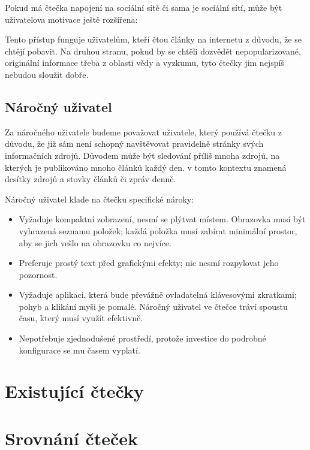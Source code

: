 Pokud má čtečka napojení na sociální sítě či sama je sociální sítí, může být uživatelova motivace ještě rozšířena:

Tento přístup funguje uživatelům, kteří čtou články na internetu z důvodu, že se chtějí pobavit.
Na druhou stranu, pokud by se chtěli dozvědět nepopularizované, originální informace třeba z oblasti vědy a vyzkumu, tyto čtečky jim nejspíš nebudou sloužit dobře.

\subsection{Náročný uživatel}

Za náročného uživatele budeme považovat uživatele, který používá čtečku z důvodu, že již sám není schopný navštěvovat pravidelně stránky svých informačních zdrojů.
Důvodem může být sledování příliš mnoha zdrojů, na kterých je publikováno mnoho článků každý den.
 v tomto kontextu znamená desítky zdrojů a stovky článků či zpráv denně.

Náročný uživatel klade na čtečku specifické nároky:
\begin{itemize}
    \item Vyžaduje kompaktní zobrazení, nesmí se plýtvat místem.
        Obrazovka musí být vyhrazená seznamu položek; každá položka musí zabírat minimální prostor, aby se jich vešlo na obrazovku co nejvíce.
    \item Preferuje prostý text před grafickými efekty; nic nesmí rozpylovat jeho pozornost.
    \item Vyžaduje aplikaci, která bude převážně ovladatelná klávesovými zkratkami; pohyb a klikání myši je pomalé.
        Náročný uživatel ve čtečce tráví spoustu času, který musí využít efektivně.
    \item Nepotřebuje zjednodušené prostředí, protože investice do podrobné konfigurace se mu časem vyplatí.
\end{itemize}

\section{Existující čtečky}


\section{Srovnání čteček}

